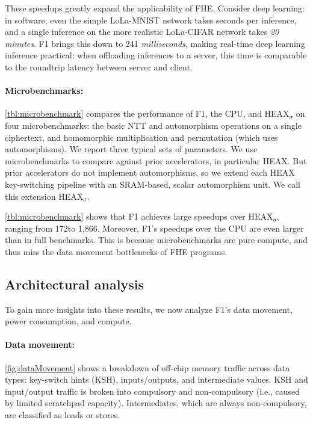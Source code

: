 These speedups greatly expand the applicability of FHE. Consider deep learning:
in software, even the simple LoLa-MNIST network takes seconds per inference,
and a single inference on the more realistic LoLa-CIFAR network takes \emph{20 minutes}.
F1 brings this down to 241 \emph{milliseconds},
making real-time deep learning inference practical:
when offloading inferences to a server, this time is comparable
to the roundtrip latency between server and client.

\paragraph{Microbenchmarks:}
\autoref{tbl:microbenchmark} compares the performance of F1, the CPU, and HEAX$_\sigma$ on four microbenchmarks:
the basic NTT and automorphism operations on a single ciphertext,
and homomorphic multiplication and permutation (which uses automorphisms).
We report three typical sets of parameters.
We use microbenchmarks to compare against prior accelerators,
in particular HEAX.
But prior accelerators do not implement automorphisms,
so we extend each HEAX key-switching pipeline with an SRAM-based, scalar automorphism unit.
We call this extension HEAX$_\sigma$.

\autoref{tbl:microbenchmark} shows that
F1 achieves large speedups over HEAX$_\sigma$,
ranging from 172\x to 1,866\x.
Moreover, F1's speedups over the CPU are even larger than in full benchmarks.
This is because microbenchmarks are pure compute,
and thus miss the data movement bottlenecks of FHE programs.

\subsection{Architectural analysis}

To gain more insights into these results, we now analyze F1's data movement, power consumption, and compute.

\paragraph{Data movement:}
\autoref{fig:dataMovement} shows a breakdown of off-chip memory traffic across data types:
key-switch hints (KSH), inputs/outputs, and intermediate values.
KSH and input/output traffic is broken into compulsory and
non-compulsory (i.e., caused by limited scratchpad capacity).
Intermediates, which are always non-compulsory, are classified as loads or stores.

